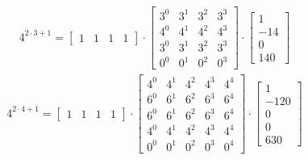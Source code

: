 \begin{align*}
    4^{2 \cdot 3 + 1} =
    \begin{bmatrix}
        1 & 1 & 1 & 1
    \end{bmatrix}
    \cdot
    \begin{bmatrix}
        3^0 & 3^1 & 3^2 & 3^3 \\
        4^0 & 4^1 & 4^2 & 4^3 \\
        3^0 & 3^1 & 3^2 & 3^3 \\
        0^0 & 0^1 & 0^2 & 0^3
    \end{bmatrix}
    \cdot
    \begin{bmatrix}
        1   \\
        -14 \\
        0   \\
        140
    \end{bmatrix}
\end{align*}
\begin{align*}
    4^{2 \cdot 4 + 1} =
    \begin{bmatrix}
        1 & 1 & 1 & 1
    \end{bmatrix}
    \cdot
    \begin{bmatrix}
        4^0 & 4^1 & 4^2 & 4^3 & 4^4 \\
        6^0 & 6^1 & 6^2 & 6^3 & 6^4 \\
        6^0 & 6^1 & 6^2 & 6^3 & 6^4 \\
        4^0 & 4^1 & 4^2 & 4^3 & 4^4 \\
        0^0 & 0^1 & 0^2 & 0^3 & 0^4
    \end{bmatrix}
    \cdot
    \begin{bmatrix}
        1    \\
        -120 \\
        0    \\
        0    \\
        630
    \end{bmatrix}
\end{align*}
